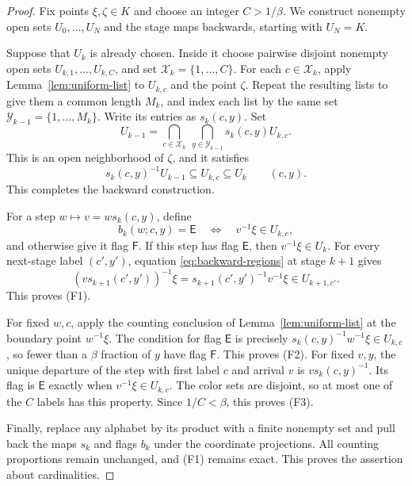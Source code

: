 \documentclass[11pt]{article}
\numberwithin{equation}{section}
\theoremstyle{definition}
\theoremstyle{remark}
\newcommand{\E}{\mathsf E}
\newcommand{\F}{\mathsf F}
\begin{document}
\begin{proof}
Fix points $\xi,\zeta\in K$ and choose an integer $C>1/\beta$.
We construct nonempty open sets $U_0,\ldots,U_N$ and the stage maps
backwards, starting with $U_N=K$.

Suppose that $U_k$ is already chosen.  Inside it choose pairwise
disjoint nonempty open sets $U_{k,1},\ldots,U_{k,C}$, and set
$\mathcal X_k=\{1,\ldots,C\}$.  For each $c\in\mathcal X_k$, apply
Lemma~\ref{lem:uniform-list} to $U_{k,c}$ and the point $\zeta$.
Repeat the resulting lists to give them a common length $M_k$, and
index each list by the same set
$\mathcal Y_{k-1}=\{1,\ldots,M_k\}$.  Write its entries as $s_k(c,y)$.
Set
\[
 U_{k-1}
   =\bigcap_{c\in\mathcal X_k}\ 
      \bigcap_{y\in\mathcal Y_{k-1}}s_k(c,y)U_{k,c}.
\]
This is an open neighborhood of $\zeta$, and it satisfies
\begin{equation}\label{eq:backward-regions}
 s_k(c,y)^{-1}U_{k-1}\subseteq U_{k,c}
       \subseteq U_k\qquad(c,y).
\end{equation}
This completes the backward construction.

For a step $w\longmapsto v=w s_k(c,y)$, define
\begin{equation}\label{eq:boundary-flags}
 b_k(w;c,y)=\E
 \quad\Longleftrightarrow\quad v^{-1}\xi\in U_{k,c},
\end{equation}
and otherwise give it flag $\F$.
If this step has flag $\E$, then $v^{-1}\xi\in U_k$.
For every next-stage label $(c',y')$, equation
\eqref{eq:backward-regions} at stage $k+1$ gives
\[
 (v s_{k+1}(c',y'))^{-1}\xi
   =s_{k+1}(c',y')^{-1}v^{-1}\xi\in U_{k+1,c'}.
\]
This proves \textup{(F1)}.

For fixed $w,c$, apply the counting conclusion of
Lemma~\ref{lem:uniform-list} at the boundary point $w^{-1}\xi$.
The condition for flag $\E$ is precisely
$s_k(c,y)^{-1}w^{-1}\xi\in U_{k,c}$, so fewer than a
$\beta$ fraction of $y$ have flag $\F$.  This proves \textup{(F2)}.
For fixed $v,y$, the unique departure of the step with first label $c$
and arrival $v$ is $v s_k(c,y)^{-1}$.  Its flag is $\E$ exactly when
$v^{-1}\xi\in U_{k,c}$.  The color sets are disjoint, so at most one
of the $C$ labels has this property.  Since $1/C<\beta$, this proves
\textup{(F3)}.

Finally, replace any alphabet by its product with a finite nonempty
set and pull back the maps $s_k$ and flags $b_k$ under the coordinate
projections.  All counting proportions remain unchanged, and
\textup{(F1)} remains exact.  This proves the assertion about
cardinalities.
\end{proof}
\end{document}
